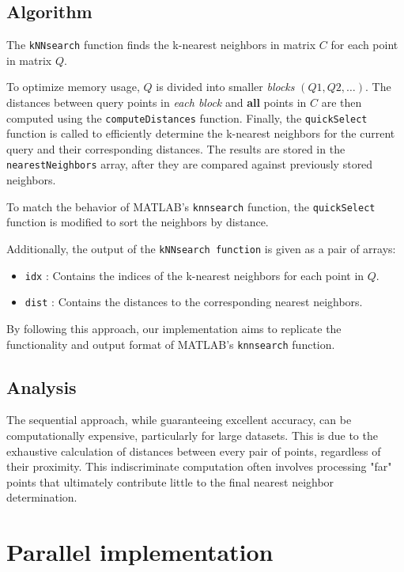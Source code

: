 \documentclass{article}
\begin{document}
\subsection{Algorithm}

The \texttt{kNNsearch} function finds the k-nearest neighbors in matrix $C$ for each point in matrix $Q$.

To optimize memory usage, $Q$ is divided into smaller \emph{blocks} $(Q1, Q2, \dots)$. 
The distances between query points in \emph{each block} and \textbf{all} points in $C$ are then computed using the \texttt{computeDistances} function.
Finally, the \texttt{quickSelect} function is called to efficiently determine the k-nearest neighbors for the current query and their corresponding distances.
The results are stored in the \texttt{nearestNeighbors} array, after they are compared against previously stored neighbors.

To match the behavior of MATLAB's \texttt{knnsearch} function, the \texttt{quickSelect} function is modified to sort the neighbors by distance.

Additionally, the output of the \texttt{kNNsearch function} is given as a pair of arrays:
\begin{itemize}
    \item \texttt{idx} : Contains the indices of the k-nearest neighbors for each point in $Q$.
    \item \texttt{dist} : Contains the distances to the corresponding nearest neighbors.
\end{itemize}

By following this approach, our implementation aims to replicate the functionality and output format of MATLAB's \texttt{knnsearch} function.

\subsection{Analysis}
The sequential approach, while guaranteeing excellent accuracy, can be computationally expensive, particularly for large datasets. 
This is due to the exhaustive calculation of distances between every pair of points, regardless of their proximity. 
This indiscriminate computation often involves processing "far" points that ultimately contribute little to the final nearest neighbor determination.


\section{Parallel implementation}
\end{document}
